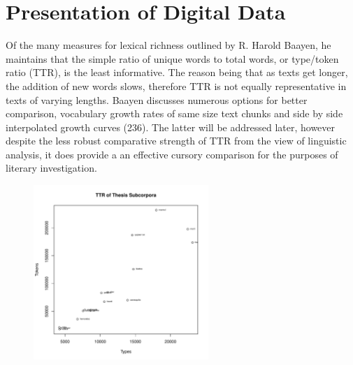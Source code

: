 \documentclass[12pt]{report}
\newenvironment{knitrout}{}{} %
\begin{document}
\section{Presentation of Digital Data}
Of the many measures for lexical richness outlined by R. Harold Baayen, he maintains that the simple ratio of unique words to total words, or type/token ratio (TTR), is the least informative. 
The reason being that as texts get longer, the addition of new words slows, therefore TTR is not equally representative in texts of varying lengths. 
Baayen discusses numerous options for better comparison, vocabulary growth rates of same size text chunks and side by side interpolated growth curves (236)\nocite{Baayen2008}.
The latter will be addressed later, however despite the less robust comparative strength of TTR from the view of linguistic analysis, it does provide a an effective cursory comparison for the purposes of literary investigation. 

\begin{figure}
	\caption{}
	\label{fig:TTR}
\begin{knitrout}
\color{fgcolor}
\includegraphics[width=250,height=250]{figure/TTR-1} 

\end{knitrout}
\end{figure} 
\end{document}

